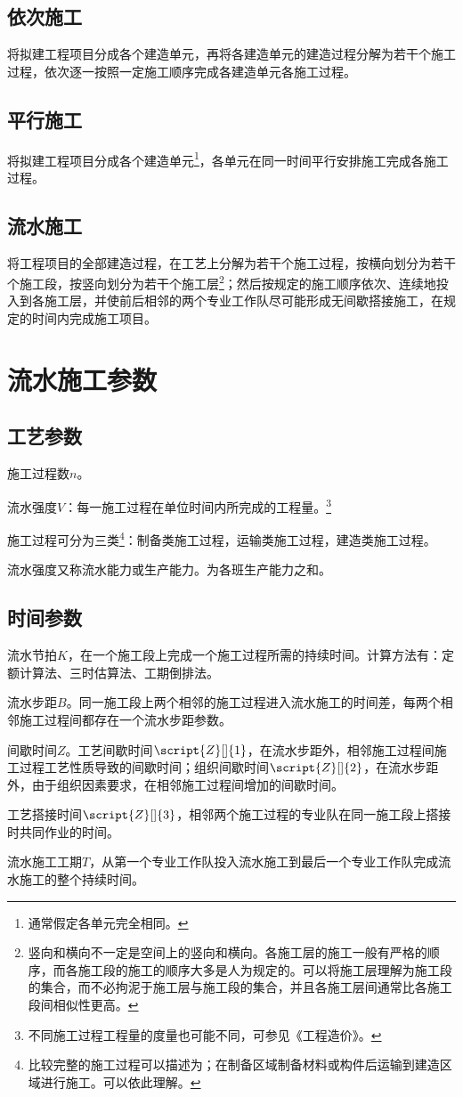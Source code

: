\documentclass{book}
\begin{document}
\subsection{依次施工}
\par 将拟建工程项目分成各个建造单元，再将各建造单元的建造过程分解为若干个施工过程，依次逐一按照一定施工顺序完成各建造单元各施工过程。
\subsection{平行施工}
\par 将拟建工程项目分成各个建造单元\footnote{通常假定各单元完全相同。}，各单元在同一时间平行安排施工完成各施工过程。
\subsection{流水施工}
\par 将工程项目的全部建造过程，在工艺上分解为若干个施工过程，按横向划分为若干个施工段，按竖向划分为若干个施工层\footnote{竖向和横向不一定是空间上的竖向和横向。各施工层的施工一般有严格的顺序，而各施工段的施工的顺序大多是人为规定的。可以将施工层理解为施工段的集合，而不必拘泥于施工层与施工段的集合，并且各施工层间通常比各施工段间相似性更高。}；然后按规定的施工顺序依次、连续地投入到各施工层，并使前后相邻的两个专业工作队尽可能形成无间歇搭接施工，在规定的时间内完成施工项目。
\section{流水施工参数}
\subsection{工艺参数}
\par 施工过程数$n$。
\par 流水强度$V$：每一施工过程在单位时间内所完成的工程量。\footnote{不同施工过程工程量的度量也可能不同，可参见《工程造价》。}
\par 施工过程可分为三类\footnote{比较完整的施工过程可以描述为；在制备区域制备材料或构件后运输到建造区域进行施工。可以依此理解。}：制备类施工过程，运输类施工过程，建造类施工过程。
\par 流水强度又称流水能力或生产能力。为各班生产能力之和。
\subsection{时间参数}
\par 流水节拍$K$，在一个施工段上完成一个施工过程所需的持续时间。计算方法有：定额计算法、三时估算法、工期倒排法。
\par 流水步距$B$。同一施工段上两个相邻的施工过程进入流水施工的时间差，每两个相邻施工过程间都存在一个流水步距参数。
\par 间歇时间$Z$。工艺间歇时间$\script{Z}[]{1}$，在流水步距外，相邻施工过程间施工过程工艺性质导致的间歇时间；组织间歇时间$\script{Z}[]{2}$，在流水步距外，由于组织因素要求，在相邻施工过程间增加的间歇时间。
\par 工艺搭接时间$\script{Z}[]{3}$，相邻两个施工过程的专业队在同一施工段上搭接时共同作业的时间。
\par 流水施工工期$T$，从第一个专业工作队投入流水施工到最后一个专业工作队完成流水施工的整个持续时间。
\end{document}
